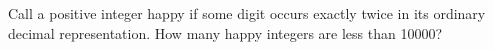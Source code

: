 Call a positive integer happy if some digit occurs exactly twice in its ordinary decimal representation. How many happy integers are less than 10000?
